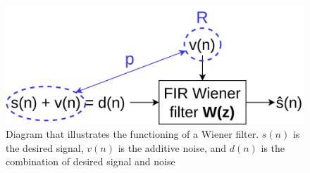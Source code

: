 \begin{figure}[h!t]
	\begin{center}
		\includegraphics[width=0.7\columnwidth]{images/wiener_filter_diagram.png}
	\end{center}
	\caption{Diagram that illustrates the functioning of a Wiener filter. $s(n)$ is the desired signal, $v(n)$ is the additive noise, and $d(n)$ is the combination of desired signal and noise \cite{wiener_filter_system_identification}}
	\label{fig:wiener_filter_diagram}
\end{figure}


